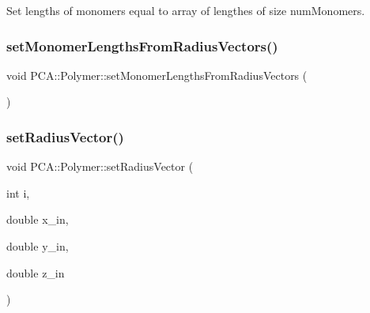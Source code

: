 Set lengths of monomers equal to array of lengthes of size num\+Monomers. 

\hypertarget{class_p_c_a_1_1_polymer_a2dae638afa952c286c16122c7ab52b6e}{}\label{class_p_c_a_1_1_polymer_a2dae638afa952c286c16122c7ab52b6e} 
\subsubsection{\texorpdfstring{set\+Monomer\+Lengths\+From\+Radius\+Vectors()}{setMonomerLengthsFromRadiusVectors()}}
{\footnotesize\ttfamily void P\+C\+A\+::\+Polymer\+::set\+Monomer\+Lengths\+From\+Radius\+Vectors (\begin{DoxyParamCaption}{ }\end{DoxyParamCaption})}

\hypertarget{class_p_c_a_1_1_polymer_a0c6e93aa35271b98d92a38afd2b0913d}{}\label{class_p_c_a_1_1_polymer_a0c6e93aa35271b98d92a38afd2b0913d} 
\subsubsection{\texorpdfstring{set\+Radius\+Vector()}{setRadiusVector()}}
{\footnotesize\ttfamily void P\+C\+A\+::\+Polymer\+::set\+Radius\+Vector (\begin{DoxyParamCaption}\item[{int}]{i,  }\item[{double}]{x\+\_\+in,  }\item[{double}]{y\+\_\+in,  }\item[{double}]{z\+\_\+in }\end{DoxyParamCaption})\hspace{0.3cm}{\ttfamily [inline]}}

\hypertarget{class_p_c_a_1_1_polymer_a258f607c38c1a247dd37659b236aa3fa}{}\label{class_p_c_a_1_1_polymer_a258f607c38c1a247dd37659b236aa3fa} 
